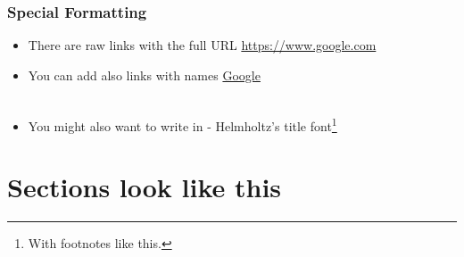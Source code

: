 \documentclass[aspectratio=1610]{beamer}
\begin{document}
\begin{frame}
    \frametitle{Special Formatting}

    \begin{itemize}
        \item There are raw links with the full URL \url{https://www.google.com}
        \item You can add also links with names \href{https://www.google.com}{Google}\\~
				\item You might also want to write in  - Helmholtz's title font\footnote{With footnotes like this.}
    \end{itemize}
\end{frame}

\section{Sections look like this}
\end{document}

